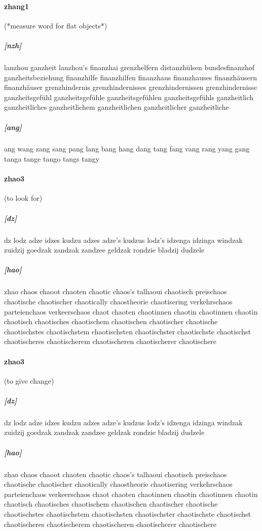 \documentclass{article}
\begin{document}
\paragraph{zhang1}(*measure word for flat objects*) \subparagraph{[nzh]}lanzhou
ganzheit
lanzhou's
finanzhai
grenzhelfern
distanzhülsen
bundesfinanzhof
ganzheitsbeziehung
finanzhilfe finanzhilfen
finanzhaus finanzhauses finanzhäusern finanzhäuser
grenzhindernis grenzhindernisses grenzhindernissen grenzhindernisse
ganzheitsgefühl ganzheitsgefühle ganzheitsgefühlen ganzheitsgefühls
ganzheitlich ganzheitliches ganzheitlichem ganzheitlichen ganzheitlicher ganzheitliche
\subparagraph{[ang]}ang
wang
zang
sang
pang
lang
bang
hang
dang
tang
fang
vang
rang
yang
gang
tanga
tange
tango
tangs
tangy
\paragraph{zhao3}(to look for) \subparagraph{[dz]}dz
lodz
adze
idzes
kudzu
adzes
adze's
kudzus
lodz's
idzenga
idzinga
windzak
zuidzij
goedzak
zandzak
zandzee
geldzak
rondzie
bladzij
dudzele
\subparagraph{[hao]}zhao
chaos
chaoot
chaoten
chaotic
chaos's
talhaoui
chaotisch
preischaos
chaotische
chaotischer
chaotically
chaostheorie
chaotisering
verkehrschaos
parteienchaos
verkeerschaos
chaot chaoten chaotinnen chaotin chaotinnen chaotin
chaotisch chaotisches chaotischem chaotischen chaotischer chaotische chaotischstes chaotischstem chaotischsten chaotischster chaotischste chaotischst chaotischeres chaotischerem chaotischeren chaotischerer chaotischere
\paragraph{zhao3}(to give change) \subparagraph{[dz]}dz
lodz
adze
idzes
kudzu
adzes
adze's
kudzus
lodz's
idzenga
idzinga
windzak
zuidzij
goedzak
zandzak
zandzee
geldzak
rondzie
bladzij
dudzele
\subparagraph{[hao]}zhao
chaos
chaoot
chaoten
chaotic
chaos's
talhaoui
chaotisch
preischaos
chaotische
chaotischer
chaotically
chaostheorie
chaotisering
verkehrschaos
parteienchaos
verkeerschaos
chaot chaoten chaotinnen chaotin chaotinnen chaotin
chaotisch chaotisches chaotischem chaotischen chaotischer chaotische chaotischstes chaotischstem chaotischsten chaotischster chaotischste chaotischst chaotischeres chaotischerem chaotischeren chaotischerer chaotischere
\end{document}

